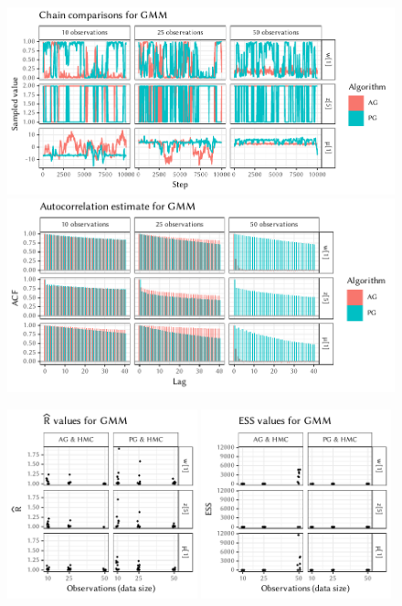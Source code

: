 \begin{figure}[p]
  \centering
  \includegraphics[width=\textwidth]{figures/GMM-chains}
  \par
  \includegraphics[width=\textwidth]{figures/GMM-acfs}
  \par
  \includegraphics[width=0.49\textwidth]{figures/GMM-rhat}
  \includegraphics[width=0.49\textwidth]{figures/GMM-ess}
\end{figure}

